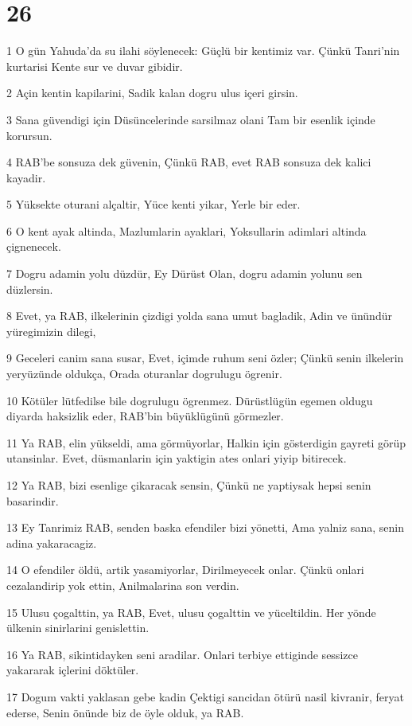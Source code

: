 \chapter{26}

\par 1 O gün Yahuda'da su ilahi söylenecek: Güçlü bir kentimiz var. Çünkü Tanri'nin kurtarisi Kente sur ve duvar gibidir.
\par 2 Açin kentin kapilarini, Sadik kalan dogru ulus içeri girsin.
\par 3 Sana güvendigi için Düsüncelerinde sarsilmaz olani Tam bir esenlik içinde korursun.
\par 4 RAB'be sonsuza dek güvenin, Çünkü RAB, evet RAB sonsuza dek kalici kayadir.
\par 5 Yüksekte oturani alçaltir, Yüce kenti yikar, Yerle bir eder.
\par 6 O kent ayak altinda, Mazlumlarin ayaklari, Yoksullarin adimlari altinda çignenecek.
\par 7 Dogru adamin yolu düzdür, Ey Dürüst Olan, dogru adamin yolunu sen düzlersin.
\par 8 Evet, ya RAB, ilkelerinin çizdigi yolda sana umut bagladik, Adin ve ünündür yüregimizin dilegi,
\par 9 Geceleri canim sana susar, Evet, içimde ruhum seni özler; Çünkü senin ilkelerin yeryüzünde oldukça, Orada oturanlar dogrulugu ögrenir.
\par 10 Kötüler lütfedilse bile dogrulugu ögrenmez. Dürüstlügün egemen oldugu diyarda haksizlik eder, RAB'bin büyüklügünü görmezler.
\par 11 Ya RAB, elin yükseldi, ama görmüyorlar, Halkin için gösterdigin gayreti görüp utansinlar. Evet, düsmanlarin için yaktigin ates onlari yiyip bitirecek.
\par 12 Ya RAB, bizi esenlige çikaracak sensin, Çünkü ne yaptiysak hepsi senin basarindir.
\par 13 Ey Tanrimiz RAB, senden baska efendiler bizi yönetti, Ama yalniz sana, senin adina yakaracagiz.
\par 14 O efendiler öldü, artik yasamiyorlar, Dirilmeyecek onlar. Çünkü onlari cezalandirip yok ettin, Anilmalarina son verdin.
\par 15 Ulusu çogalttin, ya RAB, Evet, ulusu çogalttin ve yüceltildin. Her yönde ülkenin sinirlarini genislettin.
\par 16 Ya RAB, sikintidayken seni aradilar. Onlari terbiye ettiginde sessizce yakararak içlerini döktüler.
\par 17 Dogum vakti yaklasan gebe kadin Çektigi sancidan ötürü nasil kivranir, feryat ederse, Senin önünde biz de öyle olduk, ya RAB.
